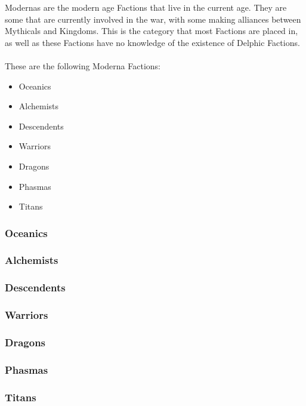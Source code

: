 Modernas are the modern age Factions that live in the current age. They are some that are currently 
involved in the war, with some making alliances between Mythicals and Kingdoms. This is the 
category that most Factions are placed in, as well as these Factions have no knowledge of 
the existence of Delphic Factions. 
\\\\
These are the following Moderna Factions: 
\begin{itemize}
    \item Oceanics 
    \item Alchemists
    \item Descendents
    \item Warriors
    \item Dragons
    \item Phasmas
    \item Titans
\end{itemize}

\subsubsection*{Oceanics}

\subsubsection*{Alchemists}

\subsubsection*{Descendents}

\subsubsection*{Warriors}

\subsubsection*{Dragons}

\subsubsection*{Phasmas}

\subsubsection*{Titans}